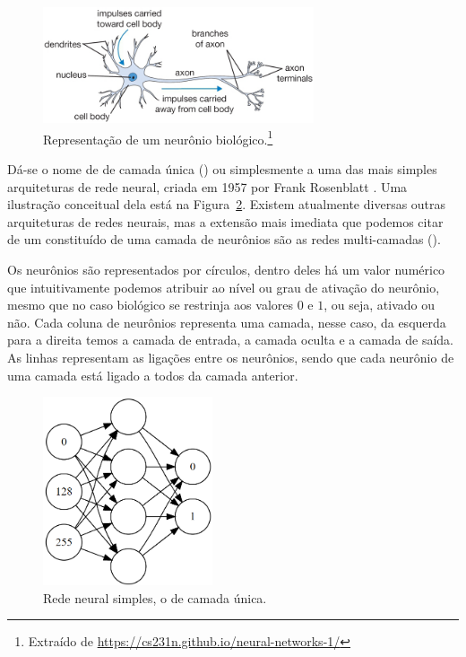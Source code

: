 \begin{figure}[htb]
\centering
\includegraphics[width=8cm]{figuras/neuron}
\caption{Representação de um neurônio biológico.\footnote{Extraído de \url{https://cs231n.github.io/neural-networks-1/}}}
\label{fig:neuron}
\end{figure}

Dá-se o nome de  de camada única () ou simplesmente  a uma das mais simples arquiteturas de rede neural, criada em 1957 por Frank Rosenblatt \citep{frank}. Uma ilustração conceitual dela está na Figura~\ref{fig:perceptron}. Existem atualmente diversas outras arquiteturas de redes neurais, mas a extensão mais imediata que podemos citar de um  constituído de uma camada de neurônios são as redes  multi-camadas (). 

Os neurônios são representados por círculos, dentro deles há um valor numérico que intuitivamente podemos atribuir ao nível ou grau de ativação do neurônio, mesmo que no caso biológico se restrinja aos valores $0$ e $1$, ou seja, ativado ou não. Cada coluna de neurônios representa uma camada, nesse caso, da esquerda para a direita temos a camada de entrada, a camada oculta e a camada de saída. As linhas representam as ligações entre os neurônios, sendo que cada neurônio de uma camada está ligado a todos da camada anterior.

\begin{figure}[htb]
\centering
\includegraphics[width=5cm]{figuras/perceptron}
\caption{Rede neural simples, o  de camada única.}
\label{fig:perceptron}
\end{figure}

